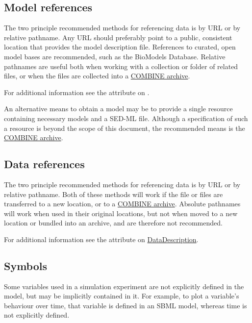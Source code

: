 \subsection{Model references}
\label{sec:modelURI}
The two principle recommended methods for referencing data is by URL or by relative pathname.  Any URL should preferably point to a public, consistent location that provides the model description file. References to curated, open model bases are recommended, such as the BioModels Database. Relative pathnames are useful both when working with a collection or folder of related files, or when the files are collected into a \hyperref[sec:archive]{COMBINE archive}.

For additional information see the \hyperref[sec:model_source]{} attribute on \Model.

An alternative means to obtain a model may be to provide a single resource containing necessary models and a SED-ML file. Although a specification of such a resource is beyond the scope of this document, the recommended means is the \hyperref[sec:archive]{COMBINE archive}.


\subsection{Data references}
\label{sec:dataURI}

The two principle recommended methods for referencing data is by URL or by relative pathname.  Both of these methods will work if the file or files are transferred to a new location, or to a \hyperref[sec:archive]{COMBINE archive}.  Absolute pathnames will work when used in their original locations, but not when moved to a new location or bundled into an archive, and are therefore not recommended.

For additional information see the \hyperref[sec:data_source]{} attribute on \hyperref[class:dataDescription]{DataDescription}.


\subsection{Symbols}
\label{sec:implicitVariable}
Some variables used in a simulation experiment are not explicitly defined in the model, but may be implicitly contained in it. For example, to plot a variable's behaviour over time, that variable is defined in an SBML model, whereas time is not explicitly defined. 


